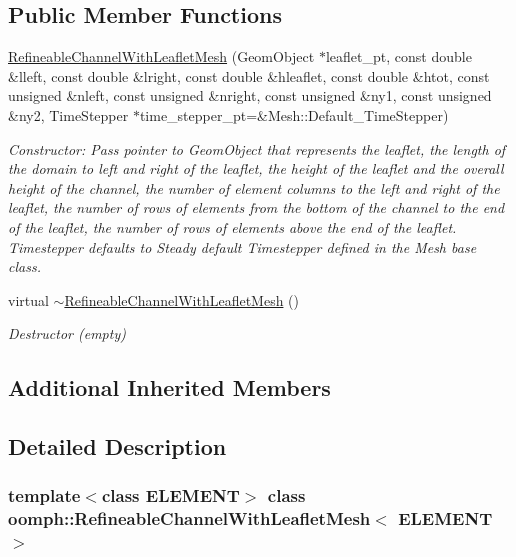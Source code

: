 \subsection*{Public Member Functions}
\begin{DoxyCompactItemize}
\item 
\hyperlink{classoomph_1_1RefineableChannelWithLeafletMesh_a9af91f13b3fd683029e2bdfbfe3abd66}{Refineable\+Channel\+With\+Leaflet\+Mesh} (Geom\+Object $\ast$leaflet\+\_\+pt, const double \&lleft, const double \&lright, const double \&hleaflet, const double \&htot, const unsigned \&nleft, const unsigned \&nright, const unsigned \&ny1, const unsigned \&ny2, Time\+Stepper $\ast$time\+\_\+stepper\+\_\+pt=\&Mesh\+::\+Default\+\_\+\+Time\+Stepper)
\begin{DoxyCompactList}\small\item\em Constructor\+: Pass pointer to Geom\+Object that represents the leaflet, the length of the domain to left and right of the leaflet, the height of the leaflet and the overall height of the channel, the number of element columns to the left and right of the leaflet, the number of rows of elements from the bottom of the channel to the end of the leaflet, the number of rows of elements above the end of the leaflet. Timestepper defaults to Steady default Timestepper defined in the Mesh base class. \end{DoxyCompactList}\item 
virtual \hyperlink{classoomph_1_1RefineableChannelWithLeafletMesh_aed441c6ae7a9078b649d733a033bd2b5}{$\sim$\+Refineable\+Channel\+With\+Leaflet\+Mesh} ()
\begin{DoxyCompactList}\small\item\em Destructor (empty) \end{DoxyCompactList}\end{DoxyCompactItemize}
\subsection*{Additional Inherited Members}


\subsection{Detailed Description}
\subsubsection*{template$<$class E\+L\+E\+M\+E\+NT$>$\newline
class oomph\+::\+Refineable\+Channel\+With\+Leaflet\+Mesh$<$ E\+L\+E\+M\+E\+N\+T $>$}

